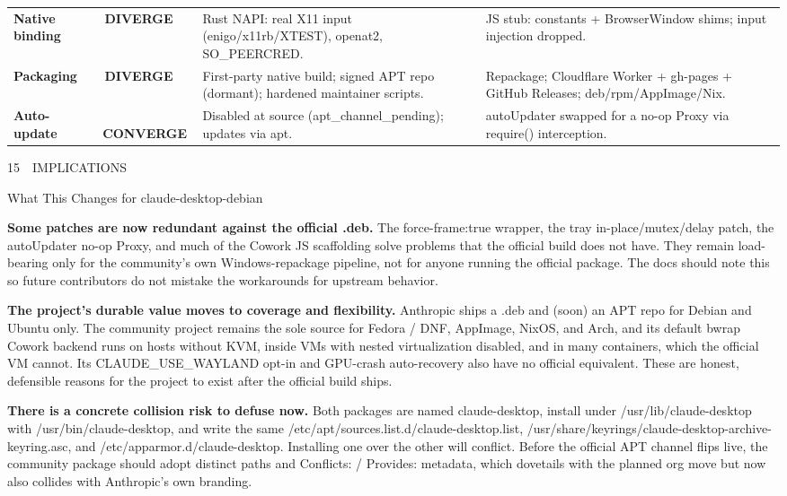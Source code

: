 \documentclass[11pt]{article}
\newcommand{\mono}{\ttfamily}
\newcommand{\reppar}[1]{{\fontsize{10.5}{15.2}\selectfont #1\par}\vspace{8pt}}
\newcommand{\code}[1]{{\mono\small #1}}
\newcommand{\reportsection}[3]{%
  \vspace{14pt}%
  {\mono\footnotesize\color{baseMid}\addfontfeatures{LetterSpace=8.0}\MakeUppercase{#1\, \textbullet\, #2}}\par
  \vspace{3pt}%
  {\heavy\fontsize{17}{19}\selectfont\color{base900} #3\par}
  \vspace{4pt}{\color{accent}\hrule height 1.6pt}\vspace{9pt}%
}
\newcommand{\tname}[1]{\textbf{\color{base700}#1}}
\newcommand{\badge}[2]{{\mono\bfseries\fontsize{7.4}{8}\selectfont\colorbox{#1}{\color{white}\,\MakeUppercase{#2}\,}}}
\newcommand{\bsame}{\badge{base700}{converge}}
\newcommand{\bdiff}{\badge{accent}{diverge}}
\begin{document}
\begin{table}[H]
\begin{tabular}{@{}>{\raggedright\arraybackslash}p{22mm} p{20mm} >{\raggedright\arraybackslash}p{69mm} >{\raggedright\arraybackslash}p{63mm}@{}}
\tname{Native binding} & \bdiff & Rust NAPI: real X11 input (enigo/x11rb/XTEST), \code{openat2}, \code{SO\_PEERCRED}. & JS stub: constants + BrowserWindow shims; input injection dropped. \\
\tname{Packaging} & \bdiff & First-party native build; signed APT repo (dormant); hardened maintainer scripts. & Repackage; Cloudflare Worker + gh-pages + GitHub Releases; deb/rpm/AppImage/Nix. \\
\tname{Auto-update} & \bsame & Disabled at source (\code{apt\_channel\_pending}); updates via apt. & \code{autoUpdater} swapped for a no-op Proxy via \code{require()} interception. \\
\end{tabular}
\end{table}

\reportsection{15}{Implications}{What This Changes for claude-desktop-debian}

\reppar{\textbf{Some patches are now redundant against the official \code{.deb}.} The force-\code{frame:true} wrapper, the tray in-place/mutex/delay patch, the \code{autoUpdater} no-op Proxy, and much of the Cowork JS scaffolding solve problems that the official build does not have. They remain load-bearing only for the community's own Windows-repackage pipeline, not for anyone running the official package. The docs should note this so future contributors do not mistake the workarounds for upstream behavior.}

\reppar{\textbf{The project's durable value moves to coverage and flexibility.} Anthropic ships a \code{.deb} and (soon) an APT repo for Debian and Ubuntu only. The community project remains the sole source for Fedora / DNF, AppImage, NixOS, and Arch, and its default \code{bwrap} Cowork backend runs on hosts without KVM, inside VMs with nested virtualization disabled, and in many containers, which the official VM cannot. Its \code{CLAUDE\_USE\_WAYLAND} opt-in and GPU-crash auto-recovery also have no official equivalent. These are honest, defensible reasons for the project to exist after the official build ships.}

\reppar{\textbf{There is a concrete collision risk to defuse now.} Both packages are named \code{claude-desktop}, install under \code{/usr/lib/claude-desktop} with \code{/usr/bin/claude-desktop}, and write the same \code{/etc/apt/sources.list.d/claude-desktop.list}, \code{/usr/share/keyrings/claude-desktop-archive-keyring.asc}, and \code{/etc/apparmor.d/claude-desktop}. Installing one over the other will conflict. Before the official APT channel flips live, the community package should adopt distinct paths and \code{Conflicts:} / \code{Provides:} metadata, which dovetails with the planned org move but now also collides with Anthropic's own branding.}
\end{document}
